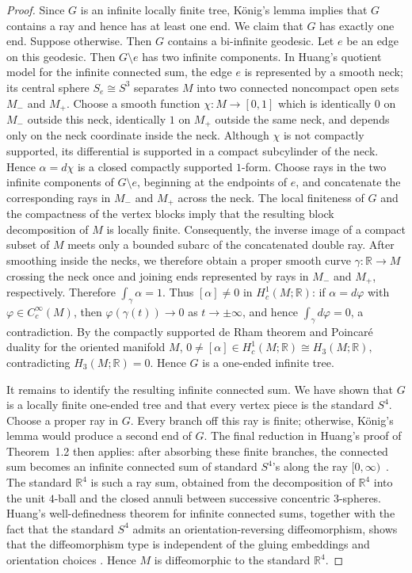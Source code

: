 \documentclass[12pt,oneside,a4paper]{article}
\theoremstyle{mytheorem}
\theoremstyle{remark}
\theoremstyle{definition}
\begin{document}
\begin{proof}
Since \(G\) is an infinite locally finite tree, K\"onig's lemma implies that
\(G\) contains a ray and hence has at least one end. We claim that \(G\) has
exactly one end. Suppose otherwise. Then \(G\) contains a bi-infinite
geodesic. Let \(e\) be an edge on this geodesic. Then \(G\setminus e\) has two infinite
components. In Huang's quotient model for the infinite connected sum, the
edge \(e\) is represented by a smooth neck; its central sphere
\(S_e\cong S^3\) separates \(M\) into two connected noncompact open sets
\(M_-\) and \(M_+\). Choose a smooth function \(\chi\colon M\to[0,1]\) which is
identically \(0\) on \(M_-\) outside this neck, identically \(1\) on \(M_+\)
outside the same neck, and depends only on the neck coordinate inside the
neck. Although \(\chi\) is not compactly supported, its differential is
supported in a compact subcylinder of the neck. Hence \(\alpha=d\chi\) is a
closed compactly supported \(1\)-form. Choose rays in the two infinite
components of \(G\setminus e\), beginning at the endpoints of \(e\), and
concatenate the corresponding rays in \(M_-\) and \(M_+\) across the
neck. The local finiteness of \(G\) and the compactness of the vertex blocks
imply that the resulting block decomposition of \(M\) is locally finite.
Consequently, the inverse image of a compact subset of \(M\) meets only a
bounded subarc of the concatenated double ray. After smoothing inside the
necks, we therefore obtain a proper smooth curve
\(\gamma\colon\mathbb R\to M\) crossing the neck once and joining ends
represented by rays in \(M_-\) and \(M_+\), respectively. Therefore
\(\int_\gamma\alpha=1\).
Thus \([\alpha]\neq0\) in \(H^1_c(M;\mathbb R)\): if
\(\alpha=d\varphi\) with \(\varphi\in C^\infty_c(M)\), then
\(\varphi(\gamma(t))\to0\) as \(t\to\pm\infty\), and hence
\(\int_\gamma d\varphi=0\), a contradiction. By the compactly supported de
Rham theorem and Poincar\'e duality for the oriented manifold \(M\),
\(0\neq [\alpha] \in H^1_c(M;\mathbb R)\cong H_3(M;\mathbb R),\) contradicting
\(H_3(M;\mathbb R)=0\). Hence
\(G\) is a one-ended infinite tree.

It remains to identify the resulting infinite connected sum. We have shown
that \(G\) is a locally finite one-ended tree and that every vertex piece is
the standard \(S^4\). Choose a proper ray in \(G\). Every branch off this ray
is finite; otherwise, K\"onig's lemma would produce a second end of \(G\).
The final reduction in Huang's proof of Theorem~1.2 then applies: after
absorbing these finite branches, the
connected sum becomes an infinite connected sum of standard \(S^4\)'s along
the ray \([0,\infty)\)~\cite[\S~3]{zbMATH07110928}. The standard
\(\mathbb R^4\) is such a ray sum, obtained from the decomposition of
\(\mathbb R^4\) into the unit \(4\)-ball and the closed annuli between
successive concentric \(3\)-spheres. Huang's well-definedness theorem for
infinite connected sums, together with the fact that the standard \(S^4\)
admits an orientation-reversing diffeomorphism, shows that the diffeomorphism
type is independent of the gluing embeddings and orientation choices
\cite[Theorem~2.2, Remark~1, and \S~3]{zbMATH07110928}. Hence \(M\) is
diffeomorphic to the standard \(\mathbb R^4\).
\end{proof}
\end{document}
